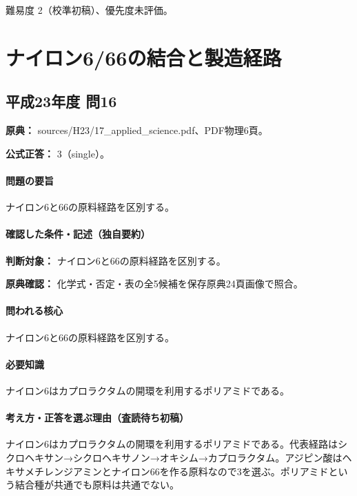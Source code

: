 \par 難易度 2（校準初稿）、優先度未評価。

\section{ナイロン6/66の結合と製造経路}

\subsection{平成23年度 問16}
\label{q:h23-reg-applied-16}

\noindent\textbf{原典：} sources/H23/17\_applied\_science.pdf、PDF物理6頁。

\textbf{公式正答：} 3（single）。

\paragraph{問題の要旨} ナイロン6と66の原料経路を区別する。

\paragraph{確認した条件・記述（独自要約）}\mbox{}\par

\noindent\textbf{判断対象：} ナイロン6と66の原料経路を区別する。\par

\noindent\textbf{原典確認：} 化学式・否定・表の全5候補を保存原典24頁画像で照合。\par

\paragraph{問われる核心} ナイロン6と66の原料経路を区別する。

\paragraph{必要知識} ナイロン6はカプロラクタムの開環を利用するポリアミドである。

\paragraph{考え方・正答を選ぶ理由（査読待ち初稿）} ナイロン6はカプロラクタムの開環を利用するポリアミドである。代表経路はシクロヘキサン→シクロヘキサノン→オキシム→カプロラクタム。アジピン酸はヘキサメチレンジアミンとナイロン66を作る原料なので3を選ぶ。ポリアミドという結合種が共通でも原料は共通でない。

